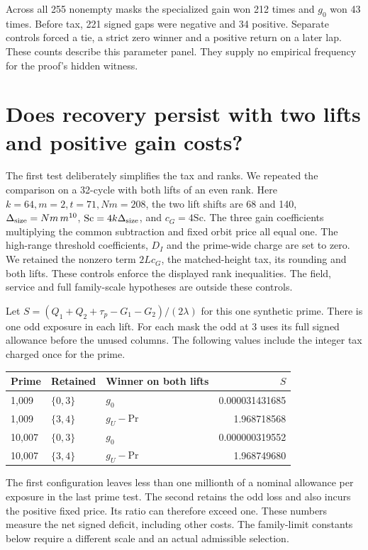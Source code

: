 \documentclass[12pt,letterpaper]{article}
\newcommand{\pagepart}[1]{\clearpage\section{#1}}
\begin{document}
Across all 255 nonempty masks the specialized gain won 212 times and \(g_0\) won 43 times. Before tax, 221 signed gaps were negative and 34 positive. Separate controls forced a tie, a strict zero winner and a positive return on a later lap. These counts describe this parameter panel. They supply no empirical frequency for the proof's hidden witness.

\pagepart{Does recovery persist with two lifts and positive gain costs?}
The first test deliberately simplifies the tax and ranks. We repeated the comparison on a 32-cycle with both lifts of an even rank. Here \(k=64,m=2,t=71,Nm=208\), the two lift shifts are 68 and 140, \(\Delta_{\rm size}=Nm\,m^{10}\), \(\mathrm{Sc}=4k\Delta_{\rm size}\), and \(c_G=4\mathrm{Sc}\). The three gain coefficients multiplying the common subtraction and fixed orbit price all equal one. The high-range threshold coefficients, \(D_I\) and the prime-wide charge are set to zero. We retained the nonzero term \(2L c_G\), the matched-height tax, its rounding and both lifts. These controls enforce the displayed rank inequalities. The field, service and full family-scale hypotheses are outside these controls.

Let \(S=(Q_1+Q_2+\tau_p-G_1-G_2)/(2\lambda)\) for this one synthetic prime. There is one odd exposure in each lift. For each mask the odd at 3 uses its full signed allowance before the unused columns. The following values include the integer tax charged once for the prime.
\begin{center}\begin{tabular}{@{}lllr@{}}\toprule
Prime & Retained & Winner on both lifts & \(S\)\\\midrule
1,009 & \(\{0,3\}\) & \(g_0\) & 0.000031431685\\
1,009 & \(\{3,4\}\) & \(g_U-\mathrm{Pr}\) & 1.968718568\\
10,007 & \(\{0,3\}\) & \(g_0\) & 0.000000319552\\
10,007 & \(\{3,4\}\) & \(g_U-\mathrm{Pr}\) & 1.968749680\\\bottomrule
\end{tabular}\end{center}
The first configuration leaves less than one millionth of a nominal allowance per exposure in the last prime test. The second retains the odd loss and also incurs the positive fixed price. Its ratio can therefore exceed one. These numbers measure the net signed deficit, including other costs. The family-limit constants below require a different scale and an actual admissible selection.
\end{document}
